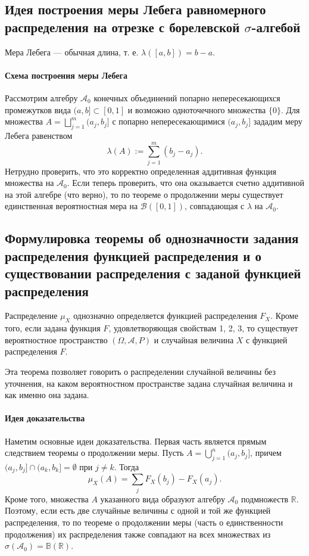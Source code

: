 \sectionbreak
\subsection{Идея построения меры Лебега равномерного распределения на отрезке с борелевской $\sigma$-алгебой}

Мера Лебега --- обычная длина, т. е. $\lambda([a, b]) = b - a$.

\paragraph{Схема построения меры Лебега}
Рассмотрим алгебру $\mathcal{A}_0$ конечных объединений попарно непересекающихся промежутков вида $(a, b] \subset [0, 1]$ и возможно одноточечного множества $\{0\}$.
Для множества $A = \bigsqcup\limits_{j = 1}^m (a_j, b_j]$ с попарно непересекающимися $(a_j, b_j]$ зададим меру Лебега равенством
\[
    \lambda(A) := \sum\limits_{j = 1}^{m}(b_j - a_j).
\]
Нетрудно проверить, что это корректно определенная аддитивная функция множества на $\mathcal{A}_0$.
Если теперь проверить, что она оказывается счетно аддитивной на этой алгебре (что верно), то по теореме о продолжении меры существует единственная вероятностная мера на $\mathcal{B}([0, 1])$,
совпадающая с $\lambda$ на $\mathcal{A}_0$.

\sectionbreak
\subsection{Формулировка теоремы об однозначности задания распределения функцией распределения и о существовании распределения с заданой функцией распределения}

\begin{theorem}
    Распределение $\mu_X$ однозначно определяется функцией распределения $F_X$.
    Кроме того, если задана функция $F$, удовлетворяющая свойствам 1, 2, 3, то существует вероятностное пространство $(\Omega, \mathcal{A}, P)$ и случайная величина $X$ с функцией распределения $F$.
\end{theorem}

Эта теорема позволяет говорить о распределении случайной величины без уточнения, на каком вероятностном пространстве задана случайная величина и как именно она задана.

\paragraph{Идея доказательства}
Наметим основные идеи доказательства.
Первая часть является прямым следствием теоремы о продолжении меры.
Пусть $A = \bigcup_{j = 1}^n (a_j, b_j]$, причем $(a_j, b_j] \cap (a_k, b_k] = \emptyset$ при $j \neq k$.
Тогда
\[
    \mu_X(A) = \sum\limits_j F_X(b_j) - F_X(a_j).
\]
Кроме того, множества $A$ указанного вида образуют алгебру $\mathcal{A}_0$ подмножеств $\mathbb{R}$.
Поэтому, если есть две случайные величины с одной и той же функцией распределения, то по теореме о продолжении меры (часть о единственности продолжения) их распределения также совпадают на всех множествах из $\sigma(\mathcal{A}_0) = \mathbb{B}(\mathbb{R})$.


